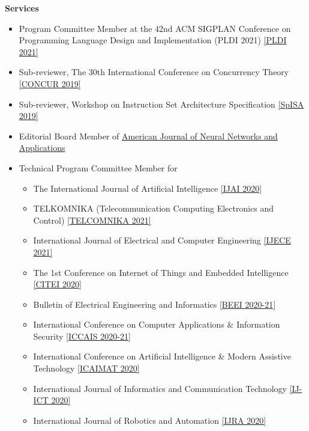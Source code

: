 \documentclass[9pt]{article}
\newenvironment{changemargin}[2]{%
  \begin{list}{}{%
    \setlength{\topsep}{0pt}%
    \setlength{\leftmargin}{#1}%
    \setlength{\rightmargin}{#2}%
    \setlength{\listparindent}{\parindent}%
    \setlength{\itemindent}{\parindent}%
    \setlength{\parsep}{\parskip}%
  }%
  \item[]}{\end{list}
}
\newenvironment{body} {
	\vspace*{-16pt}
	\begin{changemargin}{-0.25in}{-0.5in}
  }	
	{\end{changemargin}
}
\begin{document}
\begin{body}
\textbf{Services}{} \hfill  \\
	\vspace*{-4pt}
	\begin{itemize} \itemsep 3pt
          \item Program Committee Member at the 42nd ACM SIGPLAN Conference on Programming Language Design and Implementation (PLDI 2021) \href{https://pldi21.sigplan.org/}{[PLDI 2021]}
          \item Sub-reviewer, The 30th International Conference on Concurrency Theory \href{https://event.cwi.nl/concur2019/}{[CONCUR 2019]}
          \item Sub-reviewer, Workshop on Instruction Set Architecture Specification \href{https://www.cl.cam.ac.uk/~jrh13/spisa19.html}{[SpISA 2019]}
          \item Editorial Board Member of \href{http://www.ajnna.org/}{American Journal of Neural Networks and Applications}
          \item Technical Program Committee Member for
	    \begin{itemize}
              \item The International Journal of Artificial Intelligence \href{http://ijai.iaescore.com/index.php/IJAI}{[IJAI 2020]}
              \item TELKOMNIKA (Telecommunication Computing Electronics and Control) \href{http://journal.uad.ac.id/index.php/TELKOMNIKA/index}{[TELCOMNIKA 2021]}
              \item International Journal of Electrical and Computer Engineering \href{http://ijece.iaescore.com/index.php/IJECE}{[IJECE 2021]}
              \item The 1st Conference on Internet of Things and Embedded Intelligence \href{http://citei.intconference.org/}{[CITEI 2020]} 
              \item Bulletin of Electrical Engineering and Informatics  \href{https://beei.org/index.php/EEI}{[BEEI 2020-21]} 
              \item International Conference on Computer Applications \& Information Security \href{http://www.iccais.tech/}{[ICCAIS 2020-21]} 
              \item International Conference on Artificial Intelligence \& Modern Assistive Technology \href{http://icaimat.tech}{[ICAIMAT 2020]}
              \item International Journal of Informatics and Communication Technology \href{http://ijict.iaescore.com/index.php/IJICT}{[IJ-ICT 2020]}
              \item International Journal of Robotics and Automation \href{http://ijra.iaescore.com/index.php/IJRA}{[IJRA 2020]}
	    \end{itemize}
	\end{itemize}

\end{body}
\end{document}
